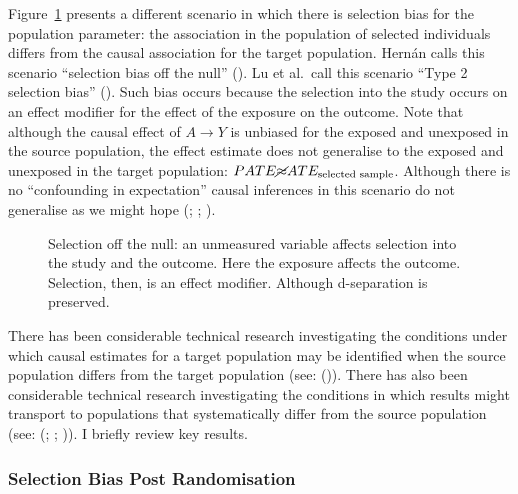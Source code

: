 \documentclass[
  singlecolumn,
  9pt]{article}
\begin{document}
Figure~\ref{fig-2} presents a different scenario in which there is
selection bias for the population parameter: the association in the
population of selected individuals differs from the causal association
for the target population. Hernán calls this scenario ``selection bias
off the null'' (). Lu et
al.~call this scenario ``Type 2 selection bias''
(). Such bias occurs because
the selection into the study occurs on an effect modifier for the effect
of the exposure on the outcome. Note that although the causal effect of
\(A\to Y\) is unbiased for the exposed and unexposed in the source
population, the effect estimate does not generalise to the exposed and
unexposed in the target population:
\(PATE \cancel{\approx} ATE_{\text{selected sample}}\). Although there
is no ``confounding in expectation'' causal inferences in this scenario
do not generalise as we might hope (; ; ).

\begin{figure}


\caption{\label{fig-2}Selection off the null: an unmeasured variable
affects selection into the study and the outcome. Here the exposure
affects the outcome. Selection, then, is an effect modifier. Although
d-separation is preserved.}

\end{figure}%

There has been considerable technical research investigating the
conditions under which causal estimates for a target population may be
identified when the source population differs from the target population
(see: ()). There has also
been considerable technical research investigating the conditions in
which results might transport to populations that systematically differ
from the source population (see:
(;
;
)). I briefly review key
results.

\subsubsection{Selection Bias Post
Randomisation}\label{selection-bias-post-randomisation-1}
\end{document}
